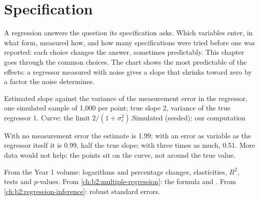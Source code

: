 \chapter{Specification}\label{ch:b2:specification}

A regression answers the question its specification asks. Which variables enter, in what form, measured how, and how
many specifications were tried before one was reported: each choice changes the answer, sometimes predictably. This
chapter goes through the common choices. The chart shows the most predictable of the effects: a regressor measured with
noise gives a slope that shrinks toward zero by a factor the noise determines.

\begin{openingchart}{Estimated slope against the variance of the measurement error in the regressor, one simulated sample
  of 1,000 per point; true slope 2, variance of the true regressor 1. Curve: the limit $2/(1 + \sigma_e^2)$.}{Simulated
  (seeded); our computation}
\end{openingchart}

With no measurement error the estimate is 1.99; with an error as variable as the regressor itself it is 0.99, half the
true slope; with three times as much, 0.51. More data would not help: the points sit on the curve, not around the true
value.

\begin{recall}
From the Year 1 volume: logarithms and percentage changes, elasticities, $R^2$, tests and $p$-values. From
\cref{ch:b2:multiple-regression}: the  formula and . From
\cref{ch:b2:regression-inference}: robust standard errors.
\end{recall}

